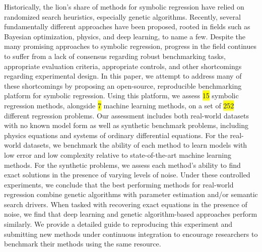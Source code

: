 Historically, the lion's share of methods for symbolic regression have relied on randomized search heuristics, especially genetic algorithms.
Recently, several fundamentally different approaches have been proposed, rooted in fields such as Bayesian optimization, physics, and deep learning, to name a few. 
Despite the many promising approaches to symbolic regression, progress in the field continues to suffer from a lack of consensus regarding robust benchmarking tasks, appropriate evaluation criteria, appropriate controls, and other shortcomings regarding experimental design. 
In this paper, we attempt to address many of these shortcomings by proposing an open-source, reproducible benchmarking platform for symbolic regression.
Using this platform, we assess \hl{15} symbolic regression methods, alongside \hl{7} machine learning methods, on a set of \hl{252} different regression problems. %
Our assessment includes both real-world datasets with no known model form as well as synthetic benchmark problems, including physics equations and systems of ordinary differential equations. 
For the real-world datasets, we benchmark the ability of each method to learn models with low error and low complexity relative to state-of-the-art machine learning methods. 
For the synthetic problems, we assess each method's ability to find exact solutions in the presence of varying levels of noise. 
Under these controlled experiments, we conclude that the best performing methods for real-world regression combine genetic algorithms with parameter estimation and/or semantic search drivers. 
When tasked with recovering exact equations in the presence of noise, we find that deep learning and genetic algorithm-based approaches perform similarly. 
We provide a detailed guide to reproducing this experiment and submitting new methods under continuous integration to encourage researchers to benchmark their methods using the same resource.
